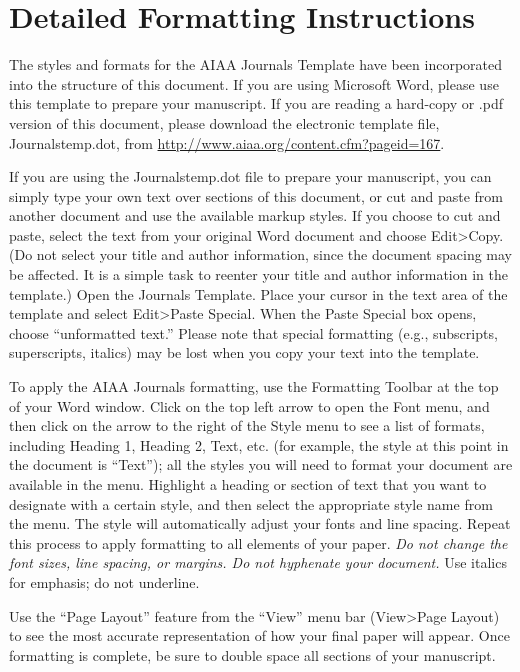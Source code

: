 \documentclass{AIAA}
\begin{document}
\section{Detailed Formatting Instructions}
The styles and formats for the AIAA Journals Template have been incorporated into the structure of this document. If you are using Microsoft Word, please use this template to prepare your manuscript. If you are reading a hard-copy or .pdf version of this document, please download the electronic template file, Journalstemp.dot, from \url{http://www.aiaa.org/content.cfm?pageid=167}.

If you are using the Journalstemp.dot file to prepare your manuscript, you can simply type your own text over sections of this document, or cut and paste from another document and use the available markup styles. If you choose to cut and paste, select the text from your original Word document and choose Edit>Copy. (Do not select your title and author information, since the document spacing may be affected. It is a simple task to reenter your title and author information in the template.) Open the Journals Template. Place your cursor in the text area of the template and select Edit>Paste Special. When the Paste Special box opens, choose ``unformatted text.'' Please note that special formatting (e.g., subscripts, superscripts, italics) may be lost when you copy your text into the template.

To apply the AIAA Journals formatting, use the Formatting Toolbar at the top of your Word window. Click on the top left arrow to open the Font menu, and then click on the arrow to the right of the Style menu to see a list of formats, including Heading 1, Heading 2, Text, etc. (for example, the style at this point in the document is ``Text''); all the styles you will need to format your document are available in the menu. Highlight a heading or section of text that you want to designate with a certain style, and then select the appropriate style name from the menu. The style will automatically adjust your fonts and line spacing. Repeat this process to apply formatting to all elements of your paper. \textit{Do not change the font sizes, line spacing, or margins. Do not hyphenate your document.} Use italics for emphasis; do not underline.

Use the ``Page Layout'' feature from the ``View'' menu bar (View>Page Layout) to see the most accurate representation of how your final paper will appear. Once formatting is complete, be sure to double space all sections of your manuscript.
\end{document}
